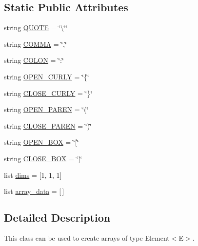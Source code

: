\subsection*{Static Public Attributes}
\begin{DoxyCompactItemize}
\item 
string \mbox{\hyperlink{class_bridges_1_1_array_1_1_array_ac5dec20ef3cb532ebf9958795fe1e6ba}{Q\+U\+O\+TE}} = \char`\"{}\textbackslash{}\char`\"{}\char`\"{}
\item 
string \mbox{\hyperlink{class_bridges_1_1_array_1_1_array_aaa9996e132ee6be70cdb359bd596dc64}{C\+O\+M\+MA}} = \char`\"{},\char`\"{}
\item 
string \mbox{\hyperlink{class_bridges_1_1_array_1_1_array_a51658cf36e5cb6dc4986b817f15509ea}{C\+O\+L\+ON}} = \char`\"{}\+:\char`\"{}
\item 
string \mbox{\hyperlink{class_bridges_1_1_array_1_1_array_ac17a4b9180df690a9a2d52bf9dc03777}{O\+P\+E\+N\+\_\+\+C\+U\+R\+LY}} = \char`\"{}\{\char`\"{}
\item 
string \mbox{\hyperlink{class_bridges_1_1_array_1_1_array_a5f584ac8114d40b68f6e56acaa932d42}{C\+L\+O\+S\+E\+\_\+\+C\+U\+R\+LY}} = \char`\"{}\}\char`\"{}
\item 
string \mbox{\hyperlink{class_bridges_1_1_array_1_1_array_a06552399334bd07d4ca2f6fd78620bba}{O\+P\+E\+N\+\_\+\+P\+A\+R\+EN}} = \char`\"{}(\char`\"{}
\item 
string \mbox{\hyperlink{class_bridges_1_1_array_1_1_array_acc374b780bd0787e492bba9826e1d639}{C\+L\+O\+S\+E\+\_\+\+P\+A\+R\+EN}} = \char`\"{})\char`\"{}
\item 
string \mbox{\hyperlink{class_bridges_1_1_array_1_1_array_aaf751e4c21d36f2d9846655e6f8dd6ce}{O\+P\+E\+N\+\_\+\+B\+OX}} = \char`\"{}\mbox{[}\char`\"{}
\item 
string \mbox{\hyperlink{class_bridges_1_1_array_1_1_array_a47c28fbf3a9f58c2f143c4c749cc913c}{C\+L\+O\+S\+E\+\_\+\+B\+OX}} = \char`\"{}\mbox{]}\char`\"{}
\item 
list \mbox{\hyperlink{class_bridges_1_1_array_1_1_array_a309aee1788e19f49aff298155b9b7c39}{dims}} = \mbox{[}1, 1, 1\mbox{]}
\item 
list \mbox{\hyperlink{class_bridges_1_1_array_1_1_array_a8c4229d7c455f8e0a571774e34d684ec}{array\+\_\+data}} = \mbox{[}$\,$\mbox{]}
\end{DoxyCompactItemize}


\subsection{Detailed Description}
This class can be used to create arrays of type Element$<$\+E$>$. 


